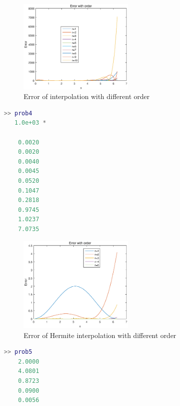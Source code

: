 \begin{figure}[!htb]
\centering
\includegraphics[width = 0.5\textwidth]{prob4.eps}
\caption{Error of interpolation with different order}
\end{figure}
\begin{lstlisting}[language = MATLAB]
>> prob4
   1.0e+03 *

    0.0020
    0.0020
    0.0040
    0.0045
    0.0520
    0.1047
    0.2818
    0.9745
    1.0237
    7.0735
\end{lstlisting}



\begin{figure}[!htb]
\centering
\includegraphics[width = 0.5\textwidth]{prob5.eps}
\caption{Error of Hermite interpolation with different order}
\end{figure}
\begin{lstlisting}[language = MATLAB]
>> prob5
    2.0000
    4.0801
    0.8723
    0.0900
    0.0056
\end{lstlisting}


